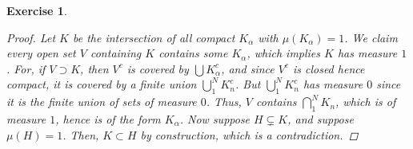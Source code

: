 \documentclass[10pt,letterpaper]{amsart}
\newtheorem{exercise}{Exercise}[section]
\theoremstyle{definition}
\theoremstyle{remark}
\numberwithin{equation}{exercise}
\begin{document}
\begin{multicols}{2}
\begin{exercise}
\begin{proof}
      Let $K$ be the intersection of all compact $K_\alpha$ with
      $\mu(K_\alpha) = 1$. We claim every open set $V$ containing $K$ contains
      some $K_\alpha$, which implies $K$ has measure $1$.
      For, if $V \supset K$,
      then $V^c$ is covered by $\bigcup K_\alpha^c$, and since $V^c$ is closed
      hence compact, it is covered by a finite union $\bigcup_1^N K_n^c$. But
      $\bigcup_1^N K_n^c$ has measure $0$ since it is the finite union of sets
      of measure $0$. Thus, $V$ contains $\bigcap_1^N K_n$, which is of measure
      $1$, hence is of the form $K_\alpha$. Now suppose $H \subsetneq K$, and
      suppose $\mu(H) = 1$. Then, $K \subset H$ by construction, which is a
      contradiction.
    \end{proof}
  \end{exercise}

\end{multicols}
\end{document}
